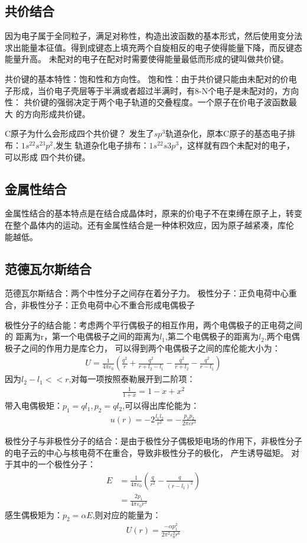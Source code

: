 \documentclass[UTF8]{article}
\numberwithin{equation}{section}
\begin{document}
\subsection{共价结合}
因为电子属于全同粒子，满足对称性，构造出波函数的基本形式，然后使用变分法
求出能量本征值。得到成键态上填充两个自旋相反的电子使得能量下降，而反键态能量升高。
未配对的电子在配对时需要使得能量最低而形成的键叫做共价键。

共价键的基本特性：饱和性和方向性。
饱和性：由于共价键只能由未配对的价电子形成，当价电子壳层等于半满或者超过半满时，有8-N个电子是未配对的，方向性：
共价键的强弱决定于两个电子轨道的交叠程度。一个原子在价电子波函数最大
的方向形成共价键。

C原子为什么会形成四个共价键？
发生了$sp^3$轨道杂化，原本C原子的基态电子排布：$1s^22s^23p^2$,发生
轨道杂化电子排布：$1s^22s3p^3$，这样就有四个未配对的电子，可以形成
四个共价键。
\subsection{金属性结合}
金属性结合的基本特点是在结合成晶体时，原来的价电子不在束缚在原子上，转变
在整个晶体内的运动。还有金属性结合是一种体积效应，因为原子越紧凑，库伦
能越低。
\subsection{范德瓦尔斯结合}
范德瓦尔斯结合：两个中性分子之间存在着分子力。
极性分子：正负电荷中心重合，非极性分子：正负电荷中心不重合形成电偶极子

极性分子的结合能：考虑两个平行偶极子的相互作用，两个电偶极子的正电荷之间的
距离为r，第一个电偶极子之间的距离为$l_1$,第二个电偶极子的距离为$l_2$,两个电偶极子之间的作用力是库仑力，
可以得到两个电偶极子之间的库伦能大小为：
\begin{align*}
    U = \frac{1}{4\pi \varepsilon_0}(\frac{q^2}{r}+\frac{q^2}{r+l_2-l_1}-\frac{q^2}{r+l_2}-\frac{q^2}{r-l_1})
\end{align*}
因为$l_2-l_1<<r$,对每一项按照泰勒展开到二阶项：
\begin{align*}
    \frac{1}{1+x}=1-x+x^2
\end{align*}
带入电偶极矩：$p_1=ql_1,p_2=ql_2$,可以得出库伦能为：
\begin{align*}
    u(r)=-2\frac{l_1l_2}{r^2}=-\frac{p_1p_2}{2\pi \varepsilon r^3}
\end{align*}

极性分子与非极性分子的结合：是由于极性分子偶极矩电场的作用下，非极性分子的电子云的中心与核电荷不在重合，导致非极性分子的极化，
产生诱导磁矩。
对于其中的一个极性分子：
\begin{align*}
    E & = \frac{1}{4\pi \varepsilon_0}(\frac{q}{r^2}-\frac{q}{(r-l_1)^2} ) \\
      & = \frac{2p_1}{4\pi \varepsilon  _0 r^3 }
\end{align*}
感生偶极矩为：$p_2=\alpha  E$,则对应的能量为：
\begin{align*}
    U(r)=\frac{-\alpha p_1^2}{2\pi^2 \varepsilon_0^2r^6}
\end{align*}
\end{document}
